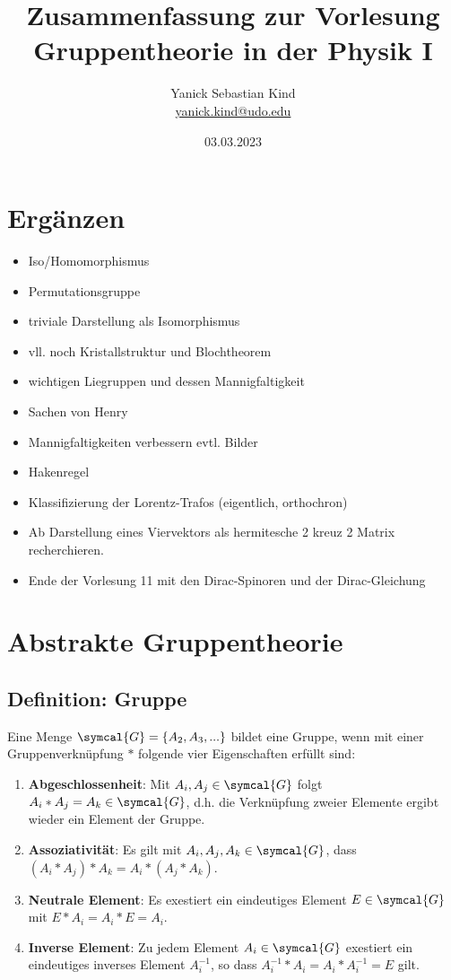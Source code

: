 \documentclass[
  captions=tableheading,  %
  titlepage=firstiscover, %
]{scrartcl}
\author{%
  Yanick Sebastian Kind\\%
  \href{mailto:yanick.kind@udo.edu}{yanick.kind@udo.edu}%
}
\title{Zusammenfassung zur Vorlesung Gruppentheorie in der Physik I}
\date{03.03.2023}
\begin{document}
\maketitle

\tableofcontents
\newpage
\section{Ergänzen}
\begin{itemize}
  \item Iso/Homomorphismus
  \item Permutationsgruppe
  \item triviale Darstellung als Isomorphismus
  \item vll. noch Kristallstruktur und Blochtheorem 
  \item wichtigen Liegruppen und dessen Mannigfaltigkeit
  \item Sachen von Henry
  \item Mannigfaltigkeiten verbessern evtl. Bilder
  \item Hakenregel  
  \item Klassifizierung der Lorentz-Trafos (eigentlich, orthochron)
  \item Ab Darstellung eines Viervektors als hermitesche 2 kreuz 2 Matrix recherchieren.
  \item Ende der Vorlesung 11 mit den Dirac-Spinoren und der Dirac-Gleichung
\end{itemize}
\section{Abstrakte Gruppentheorie}
\subsection{Definition: Gruppe}
  Eine Menge $\symcal{G} = \{A_2,A_3,...\}$ bildet eine Gruppe, wenn mit einer Gruppenverknüpfung $*$ folgende vier Eigenschaften erfüllt sind:
  \begin{enumerate}
    \item \textbf{Abgeschlossenheit}: Mit $A_i, A_j \in \symcal{G}$ folgt $A_i * A_j = A_k \in \symcal{G}$, d.h. die Verknüpfung zweier 
    Elemente ergibt wieder ein Element der Gruppe.
    \item \textbf{Assoziativität}: Es gilt mit $A_i, A_j, A_k \in \symcal{G}$, dass $(A_i * A_j) * A_k = A_i * (A_j*A_k)$.
    \item \textbf{Neutrale Element}: Es exestiert ein eindeutiges Element $E\in \symcal{G}$ mit $E * A_i = A_i * E  = A_i$.
    \item \textbf{Inverse Element}: Zu jedem Element $A_i \in \symcal{G}$ exestiert ein eindeutiges inverses Element $A_i^{-1}$,
      so dass $A_i^{-1} * A_i = A_i * A_i^{-1} = E$ gilt.
  \end{enumerate}
\end{document}
